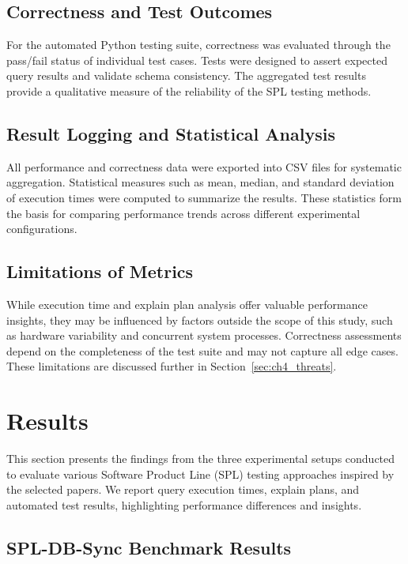 \subsection{Correctness and Test Outcomes}

For the automated Python testing suite, correctness was evaluated through the pass/fail status of individual test cases. Tests were designed to assert expected query results and validate schema consistency. The aggregated test results provide a qualitative measure of the reliability of the SPL testing methods.

\subsection{Result Logging and Statistical Analysis}

All performance and correctness data were exported into CSV files for systematic aggregation. Statistical measures such as mean, median, and standard deviation of execution times were computed to summarize the results. These statistics form the basis for comparing performance trends across different experimental configurations.

\subsection{Limitations of Metrics}

While execution time and explain plan analysis offer valuable performance insights, they may be influenced by factors outside the scope of this study, such as hardware variability and concurrent system processes. Correctness assessments depend on the completeness of the test suite and may not capture all edge cases. These limitations are discussed further in Section~\ref{sec:ch4_threats}.




\section{Results}

This section presents the findings from the three experimental setups conducted to evaluate various Software Product Line (SPL) testing approaches inspired by the selected papers. We report query execution times, explain plans, and automated test results, highlighting performance differences and insights.

\subsection{SPL-DB-Sync Benchmark Results}

